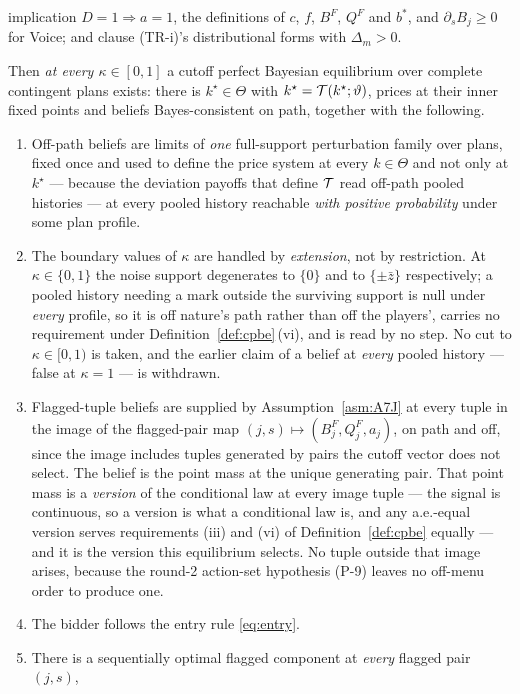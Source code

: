 \begin{proposition}
\begin{enumerate}[label=(P-\arabic*),leftmargin=3.2em,itemsep=3pt]
  implication $D = 1 \Rightarrow a = 1$, the definitions of $c$, $f$, $B^F$, $Q^F$ and $b^*$, and
  $\partial_s B_j \ge 0$ for Voice; and clause (TR-i)'s distributional forms with $\Delta_m > 0$.
\end{enumerate}
Then \emph{at every $\kappa \in [0,1]$} a cutoff perfect Bayesian equilibrium over complete
contingent plans exists: there is $k^\star \in \Theta$ with $k^\star = \mathcal{T}(k^\star;\vartheta)$,
prices at their inner fixed points and beliefs Bayes-consistent on path, together with the following.
\begin{enumerate}[label=(\roman*),leftmargin=2.4em,itemsep=3pt]
\item Off-path beliefs are limits of \emph{one} full-support perturbation family over plans, fixed
  once and used to define the price system at every $k \in \Theta$ and not only at $k^\star$ ---
  because the deviation payoffs that define $\mathcal{T}$ read off-path pooled histories --- at every
  pooled history reachable \emph{with positive probability} under some plan profile.
\item The boundary values of $\kappa$ are handled by \emph{extension}, not by restriction. At
  $\kappa \in \{0,1\}$ the noise support degenerates to $\{0\}$ and to $\{\pm\bar z\}$ respectively;
  a pooled history needing a mark outside the surviving support is null under \emph{every} profile,
  so it is off nature's path rather than off the players', carries no requirement under
  Definition~\ref{def:cpbe}\,(vi), and is read by no step. No cut to $\kappa \in [0,1)$ is taken, and
  the earlier claim of a belief at \emph{every} pooled history --- false at $\kappa = 1$ --- is
  withdrawn.
\item Flagged-tuple beliefs are supplied by Assumption~\ref{asm:A7J} at every tuple in the image of
  the flagged-pair map $(j,s) \mapsto (B_j^F,Q_j^F,a_j)$, on path and off, since the image includes
  tuples generated by pairs the cutoff vector does not select. The belief is the point mass at the
  unique generating pair. That point mass is a \emph{version} of the conditional law at every image
  tuple --- the signal is continuous, so a version is what a conditional law is, and any a.e.-equal
  version serves requirements (iii) and (vi) of Definition~\ref{def:cpbe} equally --- and it is the
  version this equilibrium selects. No tuple outside that image arises, because the round-2
  action-set hypothesis (P-9) leaves no off-menu order to produce one.
\item The bidder follows the entry rule \eqref{eq:entry}.
\item There is a sequentially optimal flagged component at \emph{every} flagged pair $(j,s)$,

\end{enumerate}
\end{proposition}

